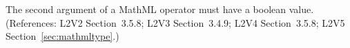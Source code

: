 The second argument of a MathML  operator must have
a boolean value.  (References: L2V2 Section~3.5.8; L2V3 Section~3.4.9; L2V4 Section~3.5.8;
L2V5 Section~\ref{sec:mathmltype}.)
